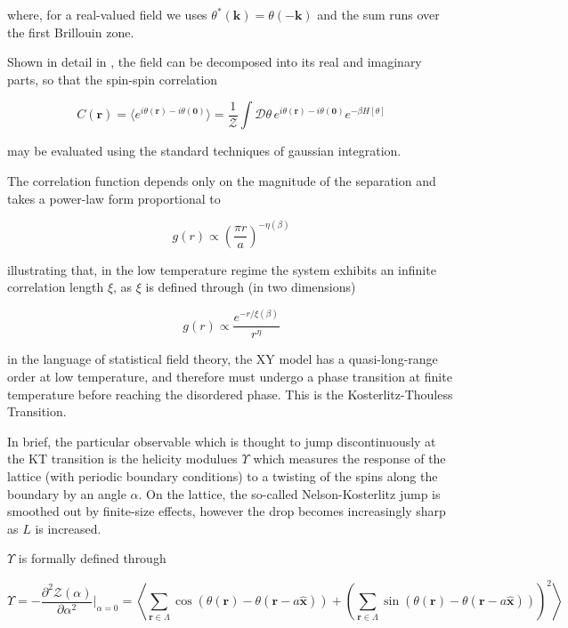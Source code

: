 \documentclass[12pt]{article}
\begin{document}
where, for a real-valued field we uses $\theta^*(\mathbf{k})=\theta(-\mathbf{k})$ and the sum runs over the first Brillouin zone.

Shown in detail in \cite{drouintouchette2022kosterlitzthoulessphasetransitionintroduction}, the field can be decomposed into its real and imaginary parts, so that the
spin-spin correlation

\begin{equation}
	C(\mathbf{r}) = \langle e^{i\theta(\mathbf{r}) - i\theta(\mathbf{0})} \rangle = \frac{1}{\mathcal{Z}} \int \mathcal{D}\theta \, e^{i\theta(\mathbf{r}) - i\theta(\mathbf{0})} e^{-\beta H[\theta]}
\end{equation}

may be evaluated using the standard techniques of gaussian integration.

The correlation function depends only on the magnitude of the separation and takes a power-law form proportional to

\begin{equation}
	g(r) \propto \left(\frac{\pi r}{a}\right)^{-\eta(\beta)}
\end{equation}

illustrating that, in the low temperature regime the system exhibits an infinite correlation length $\xi$, as $\xi$ is defined through (in two dimensions)

\begin{equation}
	g(r) \propto \frac{e^{-r/\xi(\beta)}}{r^{\eta}}
\end{equation}

in the language of statistical field theory, the XY model has a quasi-long-range order at low temperature, and therefore must undergo a phase transition
at finite temperature before reaching the disordered phase. This is the Kosterlitz-Thouless Transition. 

In brief, the particular observable which is thought to jump discontinuously at the KT transition is the helicity modulues $\Upsilon$ which measures the 
response of the lattice (with periodic boundary conditions) to a twisting of the spins along the boundary by an angle $\alpha$. On the lattice, the so-called
Nelson-Kosterlitz jump is smoothed out by finite-size effects, however the drop becomes increasingly sharp as $L$ is increased.

$\Upsilon$ is formally defined through

\begin{equation} \label{eq:helicity}
	\Upsilon = -\frac{\partial^2\mathcal{Z}(\alpha)}{\partial\alpha^2}\Big|_{\alpha=0} = \left\langle \sum_{\mathbf{r}\in\Lambda} \cos(\theta(\mathbf{r})-\theta(\mathbf{r}-a\hat{\mathbf{x}}))
	+\left( \sum_{\mathbf{r}\in\Lambda} \sin(\theta(\mathbf{r})-\theta(\mathbf{r}-a\hat{\mathbf{x}})) \right)^2 \right\rangle
\end{equation}
\end{document}

